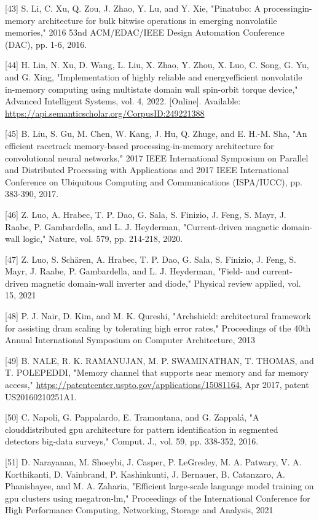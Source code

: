 \documentclass[10pt]{article}
\begin{document}
[43] S. Li, C. Xu, Q. Zou, J. Zhao, Y. Lu, and Y. Xie, "Pinatubo: A processingin-memory architecture for bulk bitwise operations in emerging nonvolatile memories," 2016 53nd ACM/EDAC/IEEE Design Automation Conference (DAC), pp. 1-6, 2016.

[44] H. Lin, N. Xu, D. Wang, L. Liu, X. Zhao, Y. Zhou, X. Luo, C. Song, G. Yu, and G. Xing, "Implementation of highly reliable and energyefficient nonvolatile in-memory computing using multistate domain wall spin-orbit torque device," Advanced Intelligent Systems, vol. 4, 2022. [Online]. Available: \href{https://api.semanticscholar.org/CorpusID:249221388}{https://api.semanticscholar.org/CorpusID:249221388}

[45] B. Liu, S. Gu, M. Chen, W. Kang, J. Hu, Q. Zhuge, and E. H.-M. Sha, "An efficient racetrack memory-based processing-in-memory architecture for convolutional neural networks," 2017 IEEE International Symposium on Parallel and Distributed Processing with Applications and 2017 IEEE International Conference on Ubiquitous Computing and Communications (ISPA/IUCC), pp. 383-390, 2017.

[46] Z. Luo, A. Hrabec, T. P. Dao, G. Sala, S. Finizio, J. Feng, S. Mayr, J. Raabe, P. Gambardella, and L. J. Heyderman, "Current-driven magnetic domain-wall logic," Nature, vol. 579, pp. 214-218, 2020.

[47] Z. Luo, S. Schären, A. Hrabec, T. P. Dao, G. Sala, S. Finizio, J. Feng, S. Mayr, J. Raabe, P. Gambardella, and L. J. Heyderman, "Field- and current-driven magnetic domain-wall inverter and diode," Physical review applied, vol. 15, 2021

[48] P. J. Nair, D. Kim, and M. K. Qureshi, "Archshield: architectural framework for assisting dram scaling by tolerating high error rates," Proceedings of the 40th Annual International Symposium on Computer Architecture, 2013

[49] B. NALE, R. K. RAMANUJAN, M. P. SWAMINATHAN, T. THOMAS, and T. POLEPEDDI, "Memory channel that supports near memory and far memory access," \href{https://patentcenter.uspto.gov/applications/15081164}{https://patentcenter.uspto.gov/applications/15081164}, Apr 2017, patent US20160210251A1.

[50] C. Napoli, G. Pappalardo, E. Tramontana, and G. Zappalá, "A clouddistributed gpu architecture for pattern identification in segmented detectors big-data surveys," Comput. J., vol. 59, pp. 338-352, 2016.

[51] D. Narayanan, M. Shoeybi, J. Casper, P. LeGresley, M. A. Patwary, V. A. Korthikanti, D. Vainbrand, P. Kashinkunti, J. Bernauer, B. Catanzaro, A. Phanishayee, and M. A. Zaharia, "Efficient large-scale language model training on gpu clusters using megatron-lm," Proceedings of the International Conference for High Performance Computing, Networking, Storage and Analysis, 2021
\end{document}
